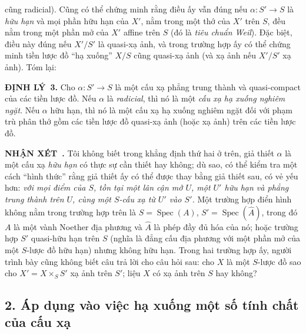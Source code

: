 \documentclass[11pt,twoside,openany]{book}
\numberwithin{equation}{section}
\newcommand{\src}[1]{%
  \phantomsection\hypertarget{src:\fgasourceid:#1}{}%
  \marginpar{\raggedleft\footnotesize\sffamily #1}%
}
\newcommand{\fgasourceid}{unset}
\newcommand{\result}[2]{\par\medskip\noindent\textbf{#1\if\relax\detokenize{#2}\relax\else\ #2\fi.}\quad}
\begin{document}
\src{318}
cũng radicial). Cũng có thể chứng minh rằng điều ấy vẫn đúng nếu
$\alpha:S'\longrightarrow S$ là \emph{hữu hạn} và mọi phần hữu hạn của $X'$,
nằm trong một thớ của $X'$ trên $S$, đều nằm trong một phần mở của $X'$ affine
trên $S$ (đó là \emph{tiêu chuẩn Weil}). Đặc biệt, điều này đúng nếu $X'/S'$ là
quasi-xạ ảnh, và trong trường hợp ấy có thể chứng minh tiền lược đồ ``hạ xuống''
$X/S$ cũng quasi-xạ ảnh (và xạ ảnh nếu $X'/S'$ xạ ảnh). Tóm lại:

\result{ĐỊNH LÝ}{3} Cho $\alpha:S'\longrightarrow S$ là một cấu xạ phẳng trung
thành và quasi-compact của các tiền lược đồ. Nếu $\alpha$ là \emph{radicial},
thì nó là một \emph{cấu xạ hạ xuống nghiêm ngặt}. Nếu $\alpha$ hữu hạn, thì nó
là một cấu xạ hạ xuống nghiêm ngặt đối với phạm trù phân thớ gồm các tiền lược
đồ quasi-xạ ảnh (hoặc xạ ảnh) trên các tiền lược đồ.

\result{NHẬN XÉT}{} Tôi không biết trong khẳng định thứ hai ở trên, giả thiết
$\alpha$ là một cấu xạ \emph{hữu hạn} có thực sự cần thiết hay không; dù sao,
có thể kiểm tra một cách ``hình thức'' rằng giả thiết ấy có thể được thay bằng
giả thiết sau, có vẻ yếu hơn: \emph{với mọi điểm của $S$, tồn tại một lân cận
mở $U$, một $U'$ hữu hạn và phẳng trung thành trên $U$, cùng một $S$-cấu xạ từ
$U'$ vào $S'$.} Một trường hợp điển hình không nằm trong trường hợp trên là
$S=\operatorname{Spec}(A)$, $S'=\operatorname{Spec}(\widehat A)$, trong đó $A$
là một vành Noether địa phương và $\widehat A$ là phép đầy đủ hóa của nó; hoặc
trường hợp $S'$ quasi-hữu hạn trên $S$ (nghĩa là đẳng cấu địa phương với một
phần mở của một $S$-lược đồ hữu hạn) nhưng không hữu hạn. Trong hai trường hợp
ấy, người trình bày cũng không biết câu trả lời cho câu hỏi sau: cho $X$ là một
$S$-lược đồ sao cho $X'=X\times_SS'$ xạ ảnh trên $S'$; liệu $X$ có xạ ảnh trên
$S$ hay không?

\subsection*{2. Áp dụng vào việc hạ xuống một số tính chất của cấu xạ}
\end{document}
